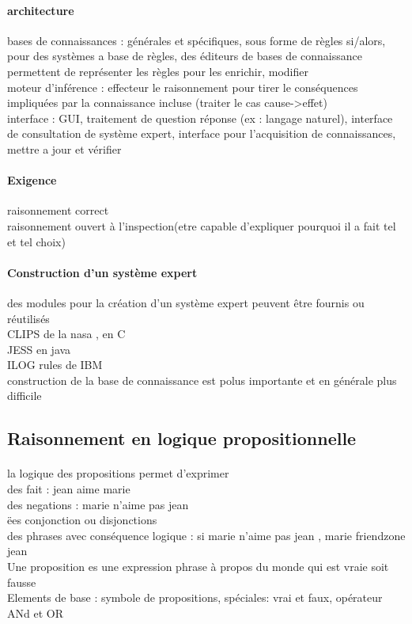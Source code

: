 \documentclass{article}
\begin{document}
\paragraph{architecture} bases de connaissances : générales et spécifiques, sous forme de règles si/alors, pour des systèmes a base de règles, des éditeurs de bases de connaissance permettent de représenter les règles pour les enrichir, modifier\\moteur d'inférence : effecteur le raisonnement pour tirer le conséquences impliquées par la connaissance incluse (traiter le cas cause->effet)\\interface : GUI, traitement de question réponse (ex : langage naturel), interface de consultation de système expert, interface pour l'acquisition de connaissances, mettre a jour et vérifier
\paragraph{Exigence} raisonnement correct\\raisonnement ouvert à l'inspection(etre capable d'expliquer pourquoi il a fait tel et tel choix)
\paragraph{Construction d'un système expert} des modules pour la création d'un système expert peuvent être fournis ou réutilisés\\CLIPS de la nasa , en C\\JESS en java\\ILOG rules de IBM\\construction de la base de connaissance est polus importante et en générale plus difficile

\subsection{Raisonnement en logique propositionnelle} 
\paragraph{} la logique des propositions permet d'exprimer\\des fait : jean aime marie\\des negations : marie n'aime pas jean\\ëes conjonction ou disjonctions\\des phrases avec conséquence logique : si marie n'aime pas jean , marie friendzone jean\\Une proposition es une expression phrase à propos du monde qui est vraie soit fausse \\Elements de base : symbole de propositions, spéciales: vrai et faux, opérateur ANd et OR\\\\
\end{document}
